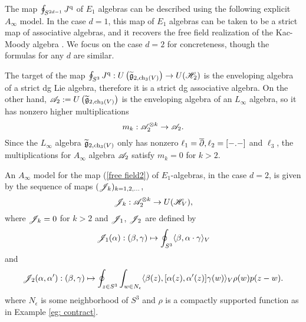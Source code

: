 \subsubsection{}

The map $\oint_{S^{2d-1}} J^{\rm q}$ of $E_1$ algebras can be described using the following explicit $A_\infty$ model.
In the case $d=1$, this map of $E_1$ algebras can be taken to be a strict map of associative algebras, and it recovers the free field realization of the Kac-Moody algebra \cite{FrenkelFree}.
We focus on the case $d=2$ for concreteness, though the formulas for any $d$ are similar. 

The target of the map $\oint_{S^3} J^{\rm q} : U\left(\widetilde{\mathfrak g}_{2, {\rm ch}_3(V)}\right) \to U(\mathscr H_{2})$ is the enveloping algebra of a strict dg Lie algebra, therefore it is a strict dg associative algebra. 
On the other hand, $\mathscr A_2 := U\left(\widetilde{\mathfrak g}_{2, {\rm ch}_3(V)}\right)$ is the enveloping algebra of an $L_\infty$ algebra, so it has nonzero higher multiplications
\[
m_k : \mathscr A_2^{\otimes k} \to \mathscr A_2 .
\] 
Since the $L_\infty$ algebra $\widetilde{\mathfrak g}_{2, {\rm ch}_3(V)}$ only has nonzero $\ell_1 = \overline{\partial}, \ell_2 = [-.-]$ and $\ell_3$, the multiplications for $A_\infty$ algebra $\mathscr A_2$ satisfy $m_k = 0$ for $k > 2$. 

\begin{prop}\label{prop: ainfinty}
An $A_\infty$ model for the map (\ref{free field2}) of $E_1$-algebras, in the case $d=2$, is given by the sequence of maps $(\mathscr J_k)_{k = 1,2,\ldots}$,
\[
\mathscr J_k : \mathscr A_2^{\otimes k} \to U(\mathscr H_V),
\]
where $\mathscr J_k = 0$ for $k > 2$ and $\mathscr J_1$, $\mathscr J_2$ are defined by
\[
\mathscr J_1 (\alpha) : (\beta,\gamma) \mapsto \oint_{S^3} \langle\beta, \alpha \cdot \gamma\rangle_V
\]
and 
\[
\mathscr J_2 (\alpha, \alpha') : (\beta,\gamma) \mapsto \oint_{z \in S^3} \int_{w \in N_{\epsilon}}  \langle\beta(z), [\alpha(z),\alpha'(z)] \gamma(w) \rangle_V \rho(w) p(z-w) .
\] 
where $N_\epsilon$ is some neighborhood of $S^3$ and $\rho$ is a compactly supported function as in Example \ref{eg: contract}.
\end{prop}

